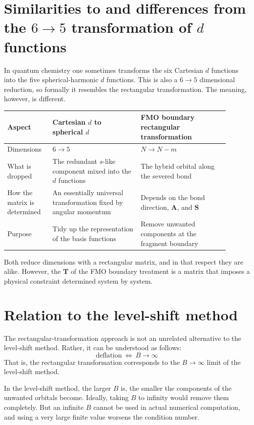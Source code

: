 \documentclass[11pt]{article}
\newcommand{\Smat}{\mathbf S}
\newcommand{\Amat}{\mathbf A}
\newcommand{\Tmat}{\mathbf T}
\begin{document}
\section{Similarities to and differences from the \(6\to5\)
transformation of \(d\) functions}

In quantum chemistry one sometimes transforms the six Cartesian \(d\)
functions into the five spherical-harmonic \(d\) functions. This is
also a \(6\to5\) dimensional reduction, so formally it resembles the
rectangular transformation. The meaning, however, is different.

\begin{center}
\begin{tabular}{|p{0.18\linewidth}|p{0.36\linewidth}|p{0.36\linewidth}|}
\hline
\textbf{Aspect} & \textbf{Cartesian \(d\) to spherical \(d\)} &
\textbf{FMO boundary rectangular transformation} \\
\hline
Dimensions & \(6\to5\) & \(N\to N-m\) \\
\hline
What is dropped & The redundant \(s\)-like component mixed into the
\(d\) functions & The hybrid orbital along the severed bond \\
\hline
How the matrix is determined & An essentially universal transformation
fixed by angular momentum & Depends on the bond direction, \(\Amat\),
and \(\Smat\) \\
\hline
Purpose & Tidy up the representation of the basis functions & Remove
unwanted components at the fragment boundary \\
\hline
\end{tabular}
\end{center}

Both reduce dimensions with a rectangular matrix, and in that respect
they are alike. However, the \(\Tmat\) of the FMO boundary treatment is
a matrix that imposes a physical constraint determined system by
system.

\section{Relation to the level-shift method}

The rectangular-transformation approach is not an unrelated alternative
to the level-shift method. Rather, it can be understood as follows:
\[
  \boxed{\text{deflation}\ \Longleftrightarrow\ B\to\infty}
\]
That is, the rectangular transformation corresponds to the
\(B\to\infty\) limit of the level-shift method.

In the level-shift method, the larger \(B\) is, the smaller the
components of the unwanted orbitals become. Ideally, taking \(B\) to
infinity would remove them completely. But an infinite \(B\) cannot be
used in actual numerical computation, and using a very large finite
value worsens the condition number.
\end{document}
